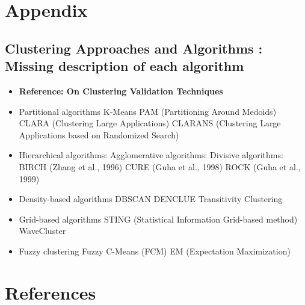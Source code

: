 \documentclass[a4paper,10pt]{article}
\theoremstyle{plain}
\theoremstyle{definition}
\begin{document}
\section{Appendix}

\subsection{Clustering Approaches and Algorithms : Missing description of each algorithm}
\begin{itemize}
	\item \textbf{Reference: On Clustering Validation Techniques}
	\item Partitional algorithms
		\subitem K-Means
		\subitem PAM (Partitioning Around Medoids)
		\subitem CLARA (Clustering Large Applications)
		\subitem CLARANS (Clustering Large Applications based on Randomized Search)
	\item Hierarchical algorithms:
		\subitem Agglomerative algorithms:
		\subitem Divisive algorithms:
		\subitem BIRCH (Zhang et al., 1996)
		\subitem CURE (Guha et al., 1998)
		\subitem ROCK (Guha et al., 1999)
	\item Density-based algorithms
		\subitem DBSCAN
		\subitem DENCLUE
		\subitem Transitivity Clustering
	\item Grid-based algorithms
		\subitem STING (Statistical Information Grid-based method)
		\subitem WaveCluster
	\item Fuzzy clustering
		\subitem Fuzzy C-Means (FCM)
		\subitem EM (Expectation Maximization)
\end{itemize}

\newpage
\section{References}
\end{document}
